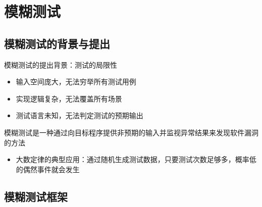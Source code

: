 \section{模糊测试}

\subsection{模糊测试的背景与提出}
模糊测试的提出背景：测试的局限性
\begin{itemize}
    \item 输入空间庞大，无法穷举所有测试用例
    \item 实现逻辑复杂，无法覆盖所有场景
    \item 测试语言未知，无法判定测试的预期输出
\end{itemize}

模糊测试是一种通过向目标程序提供非预期的输入并监视异常结果来发现软件漏洞的方法
\begin{itemize}
    \item 大数定律的典型应用：通过随机生成测试数据，只要测试次数足够多，概率低的偶然事件就会发生
\end{itemize}

\subsection{模糊测试框架}

